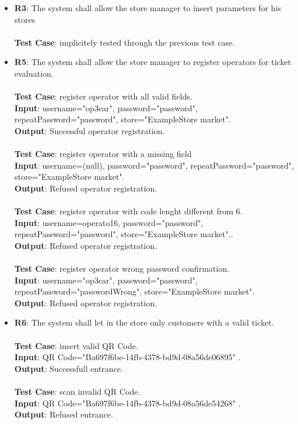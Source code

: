 \begin{itemize}
	\item \textbf{R3}: The system shall allow the store manager to insert parameters for his stores \\ \\ \textbf{Test Case}: implicitely tested through the previous test case.	






	\item \textbf{R5}: The system shall allow the store manager to register operators for ticket evaluation. \\ \\ \textbf{Test Case}: register operator with all valid fields.  \\  \textbf{Input}: username="op3car", password="password", repeatPassword="password", store="ExampleStore market".\\ 		\textbf{Output}: Successful operator registration. \\
\\ \textbf{Test Case}: register operator with a missing field \\  \textbf{Input}: username=(null), password="password", repeatPassword="password", store="ExampleStore market".\\ 		\textbf{Output}: Refused operator registration. \\
\\ \textbf{Test Case}: register operator with code lenght different from 6.  \\  \textbf{Input}: username=operato16, password="password", repeatPassword="password", store="ExampleStore market"..\\ 		\textbf{Output}: Refused operator registration.
\\ \\ \textbf{Test Case}: register operator wrong password confirmation.  \\  \textbf{Input}: username="op3car", password="password", repeatPassword="passwordWrong", store="ExampleStore market".\\ 		\textbf{Output}: Refused operator registration. \\




	\item \textbf{R6}: The system shall let in the store only customers with a valid ticket. \\ \\ \textbf{Test Case}: insert valid QR Code.  \\ 
 \textbf{Input}: QR Code="Ba697f6be-14fb-4378-bd9d-08a56de06895" .\\ 		\textbf{Output}: Successfull entrance. \\ \\ \textbf{Test Case}: scan invalid QR Code.\\ 
 \textbf{Input}: QR Code="Ba697f6be-14fb-4378-bd9d-08a56de54268" .\\ 		\textbf{Output}: Refused entrance. \\



\end{itemize}
